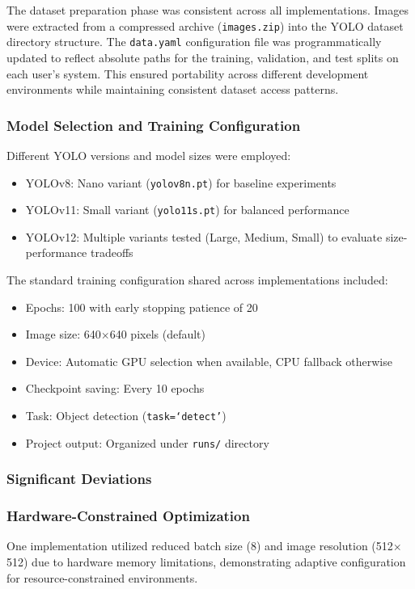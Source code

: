 \documentclass{article}
\begin{document}
The dataset preparation phase was consistent across all implementations. Images were extracted from a compressed archive (\texttt{images.zip}) into the YOLO dataset directory structure. The \texttt{data.yaml} configuration file was programmatically updated to reflect absolute paths for the training, validation, and test splits on each user's system. This ensured portability across different development environments while maintaining consistent dataset access patterns.

\subsubsection*{Model Selection and Training Configuration}

Different YOLO versions and model sizes were employed:
\begin{itemize}
    \item YOLOv8: Nano variant (\texttt{yolov8n.pt}) for baseline experiments
    \item YOLOv11: Small variant (\texttt{yolo11s.pt}) for balanced performance
    \item YOLOv12: Multiple variants tested (Large, Medium, Small) to evaluate size-performance tradeoffs
\end{itemize}

The standard training configuration shared across implementations included:
\begin{itemize}
    \item Epochs: 100 with early stopping patience of 20
    \item Image size: 640$\times$640 pixels (default)
    \item Device: Automatic GPU selection when available, CPU fallback otherwise
    \item Checkpoint saving: Every 10 epochs
    \item Task: Object detection (\texttt{task=`detect'})
    \item Project output: Organized under \texttt{runs/} directory
\end{itemize}

\subsubsection*{Significant Deviations}

\subsubsection*{Hardware-Constrained Optimization}
One implementation utilized reduced batch size (8) and image resolution (512$\times$512) due to hardware memory limitations, demonstrating adaptive configuration for resource-constrained environments.
\end{document}
